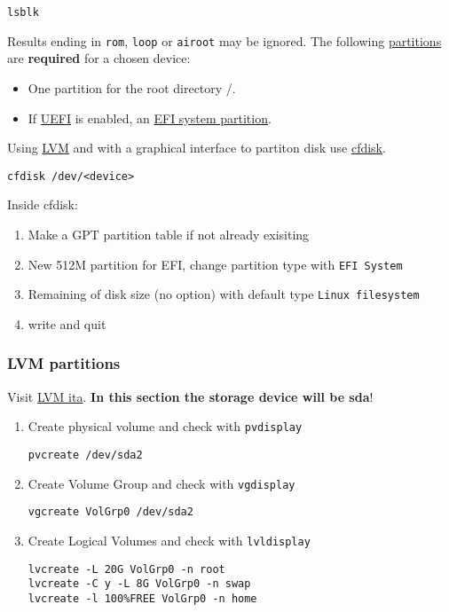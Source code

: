 \documentclass[12pt,A4]{article}
\begin{document}
\begin{verbatim}
lsblk
\end{verbatim}
Results ending in \texttt{rom}, \texttt{loop} or \texttt{airoot} may be ignored.
The following \href{https://wiki.archlinux.org/index.php/Partition}{partitions} are \textbf{required} for a chosen device:
\begin{itemize}
    \item One partition for the root directory /.
    \item If \href{https://wiki.archlinux.org/index.php/UEFI}{UEFI} is enabled, an \href{https://wiki.archlinux.org/index.php/EFI_system_partition}{EFI system partition}.
\end{itemize}
Using \href{https://wiki.archlinux.org/index.php/LVM}{LVM} and with
a graphical interface to partiton disk use \href{https://jlk.fjfi.cvut.cz/arch/manpages/man/cfdisk.8}{cfdisk}.
\begin{verbatim}
cfdisk /dev/<device>
\end{verbatim}
Inside cfdisk:
\begin{enumerate}
    \item Make a GPT partition table if not already exisiting
    \item New 512M partition for EFI, change partition type with \texttt{EFI System}
    \item Remaining of disk size (no option) with default type \texttt{Linux filesystem} 
    \item write and quit 
\end{enumerate}
\subsubsection{LVM partitions}
Visit \href{https://wiki.archlinux.org/index.php/LVM_(Italiano)}{LVM ita}. \textbf{In this section the storage device will be sda}!
\begin{enumerate}
    \item Create physical volume and check with \texttt{pvdisplay}
    \begin{verbatim}
pvcreate /dev/sda2 
    \end{verbatim}
    \item Create Volume Group and check with \texttt{vgdisplay}
    \begin{verbatim}
vgcreate VolGrp0 /dev/sda2
    \end{verbatim}
    \item Create Logical Volumes and check with \texttt{lvldisplay} 
    \begin{verbatim}
lvcreate -L 20G VolGrp0 -n root
lvcreate -C y -L 8G VolGrp0 -n swap
lvcreate -l 100%FREE VolGrp0 -n home
    \end{verbatim}
\end{enumerate}
\end{document}
